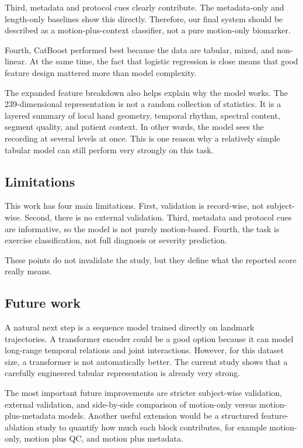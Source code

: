 \documentclass[10pt,twocolumn]{article}
\begin{document}
Third, metadata and protocol cues clearly contribute. The metadata-only and length-only baselines show this directly. Therefore, our final system should be described as a motion-plus-context classifier, not a pure motion-only biomarker.

Fourth, CatBoost performed best because the data are tabular, mixed, and non-linear. At the same time, the fact that logistic regression is close means that good feature design mattered more than model complexity.

The expanded feature breakdown also helps explain why the model works. The 239-dimensional representation is not a random collection of statistics. It is a layered summary of local hand geometry, temporal rhythm, spectral content, segment quality, and patient context. In other words, the model sees the recording at several levels at once. This is one reason why a relatively simple tabular model can still perform very strongly on this task.

\subsection{Limitations}
This work has four main limitations. First, validation is record-wise, not subject-wise. Second, there is no external validation. Third, metadata and protocol cues are informative, so the model is not purely motion-based. Fourth, the task is exercise classification, not full diagnosis or severity prediction.

These points do not invalidate the study, but they define what the reported score really means.

\subsection{Future work}
A natural next step is a sequence model trained directly on landmark trajectories. A transformer encoder could be a good option because it can model long-range temporal relations and joint interactions. However, for this dataset size, a transformer is not automatically better. The current study shows that a carefully engineered tabular representation is already very strong.

The most important future improvements are stricter subject-wise validation, external validation, and side-by-side comparison of motion-only versus motion-plus-metadata models. Another useful extension would be a structured feature-ablation study to quantify how much each block contributes, for example motion-only, motion plus QC, and motion plus metadata.
\end{document}
